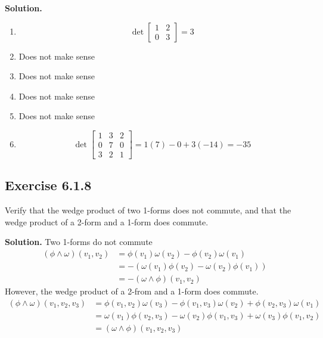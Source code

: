 \documentclass[12pt]{article}
\begin{document}
\textbf{Solution.}
\begin{enumerate}
  \item \[
    \det \begin{bmatrix}
      1 & 2 \\
      0 & 3
    \end{bmatrix}
    = 3
  \]
  \item Does not make sense 
  \item Does not make sense 
  \item Does not make sense 
  \item Does not make sense 
  \item \[
    \det \begin{bmatrix}
      1 & 3 & 2 \\
      0 & 7 & 0 \\
      3 & 2 & 1
    \end{bmatrix}
    = 1(7) - 0 + 3(-14)
    = -35
  \]
\end{enumerate}
\newpage
















\subsection*{Exercise 6.1.8}
Verify that the wedge product of two 1-forms does not commute, and that the wedge product of a 2-form and a 1-form does commute.

\medskip

\textbf{Solution.}
Two 1-forms do not commute
\begin{align*}
  (\phi \wedge \omega) (v_1, v_2)
  &= \phi(v_1)\omega(v_2) - \phi(v_2)\omega(v_1) \\
  &= - (\omega(v_1)\phi(v_2) - \omega(v_2)\phi(v_1)) \\
  &= - (\omega \wedge \phi) (v_1, v_2)
\end{align*}
However, the wedge product of a 2-from and a 1-form does commute.
\begin{align*}
  (\phi \wedge \omega) (v_1, v_2, v_3)
  &= \phi(v_1, v_2)\omega(v_3)
    - \phi(v_1, v_3)\omega(v_2)
    + \phi(v_2, v_3)\omega(v_1) \\
  &= \omega(v_1)\phi(v_2, v_3)
    - \omega(v_2)\phi(v_1, v_3)
    +  \omega(v_3)\phi(v_1, v_2) \\
  &= (\omega \wedge \phi) (v_1, v_2, v_3) \\
\end{align*}
\end{document}
